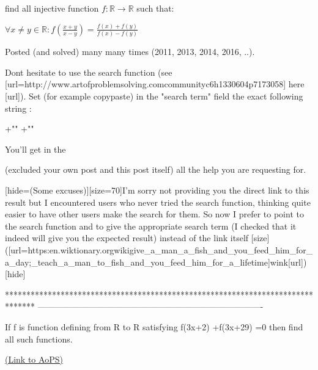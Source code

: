 \begin{solution}
	\begin{tcolorbox}find all injective function $f : \mathbb R \to \mathbb R $ such that:

 $\forall x\ne y\in\mathbb R :f(\frac{x+y}{x-y})=\frac{f(x)+f(y)}{f(x)-f(y)}$\end{tcolorbox}
Posted (and solved) many many times (2011, 2013, 2014, 2016, ..).

Dont hesitate to use the search function (see [url=http://www.artofproblemsolving.com\/community\/c6h1330604p7173058] here [\/url]).
Set (for example copy\/paste) in the "search term" field the exact following string : 

+"" +""

You'll get in the  (excluded your own post and this post itself) all the help you are requesting for.

[hide=(Some excuses)][size=70]I'm sorry not providing you the direct link to this result but I encountered users who never tried the search function, thinking quite easier to have other users make the search for them. So now I prefer to point to the search function and to give the appropriate search term (I checked that it indeed will give you the expected result) instead of the link itself [\/size]([url=https:\/\/en.wiktionary.org\/wiki\/give_a_man_a_fish_and_you_feed_him_for_a_day;_teach_a_man_to_fish_and_you_feed_him_for_a_lifetime]wink[\/url])[\/hide]


\end{solution}
*******************************************************************************
-------------------------------------------------------------------------------

\begin{problem}
	\begin{bolded}\begin{italicized}If f is function defining from R to R satisfying f(3x+2) +f(3x+29) =0 then find all such functions.\end{italicized}\end{bolded}
	\flushright \href{https://artofproblemsolving.com/community/c6h1623365}{(Link to AoPS)}
\end{problem}



